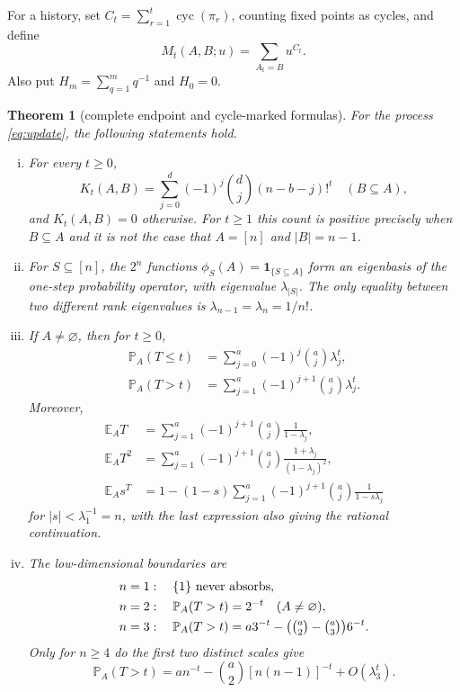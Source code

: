 \documentclass[a4paper,10pt]{amsart}
\newtheorem{theorem}{Theorem}
\theoremstyle{remark}
\newcommand{\cyc}{\operatorname{cyc}}
\newcommand{\E}{\mathbb E}
\newcommand{\Prb}{\mathbb P}
\newcommand{\ind}{\mathbf 1}
\begin{document}
For a history, set $C_t=\sum_{r=1}^t\cyc(\pi_r)$, counting fixed points as
cycles, and define
\begin{equation}\label{eq:marked-def}
 M_t(A,B;u)=\sum_{A_t=B}u^{C_t}.
\end{equation}
Also put $H_m=\sum_{q=1}^m q^{-1}$ and $H_0=0$.

\begin{theorem}[complete endpoint and cycle-marked formulas]\label{thm:main}
For the process \eqref{eq:update}, the following statements hold.
\begin{enumerate}[(i)]
\item For every $t\ge0$,
\begin{equation}\label{eq:kernel}
 K_t(A,B)=\sum_{j=0}^{d}(-1)^j\binom dj(n-b-j)!^t
 \quad(B\subseteq A),
\end{equation}
and $K_t(A,B)=0$ otherwise.  For $t\ge1$ this count is positive precisely
when $B\subseteq A$ and it is not the case that $A=[n]$ and $|B|=n-1$.

\item For $S\subseteq[n]$, the $2^n$ functions
$\phi_S(A)=\ind_{\{S\subseteq A\}}$ form an eigenbasis of the one-step
probability operator, with eigenvalue $\lambda_{|S|}$.  The only equality
between two different rank eigenvalues is
$\lambda_{n-1}=\lambda_n=1/n!$.

\item If $A\ne\varnothing$, then for $t\ge0$,
\begin{align}
 \Prb_A(T\le t)&=\sum_{j=0}^a(-1)^j\binom aj\lambda_j^t,
 \label{eq:cdf}\\
 \Prb_A(T>t)&=\sum_{j=1}^a(-1)^{j+1}\binom aj\lambda_j^t.\label{eq:survival}
\end{align}
Moreover,
\begin{align}
 \E_A T&=\sum_{j=1}^a(-1)^{j+1}\binom aj\frac1{1-\lambda_j},
 \label{eq:mean}\\
 \E_A T^2&=\sum_{j=1}^a(-1)^{j+1}\binom aj
       \frac{1+\lambda_j}{(1-\lambda_j)^2},\label{eq:second}\\
 \E_A s^T&=1-(1-s)\sum_{j=1}^a(-1)^{j+1}\binom aj
       \frac1{1-s\lambda_j}\label{eq:pgf}
\end{align}
for $|s|<\lambda_1^{-1}=n$, with the last expression also giving the
rational continuation.

\item The low-dimensional boundaries are
\begin{align*}
 n=1 &: \quad \{1\}\text{ never absorbs},\\
 n=2 &: \quad \Prb_A(T>t)=2^{-t}\quad(A\ne\varnothing),\\
 n=3 &: \quad \Prb_A(T>t)=a3^{-t}
       -\bigl(\tbinom a2-\tbinom a3\bigr)6^{-t}.
\end{align*}
Only for $n\ge4$ do the first two distinct scales give
\begin{equation}\label{eq:asymptotic}
 \Prb_A(T>t)=a n^{-t}-\binom a2[n(n-1)]^{-t}
                 +O(\lambda_3^t).
\end{equation}


\end{enumerate}
\end{theorem}
\end{document}
